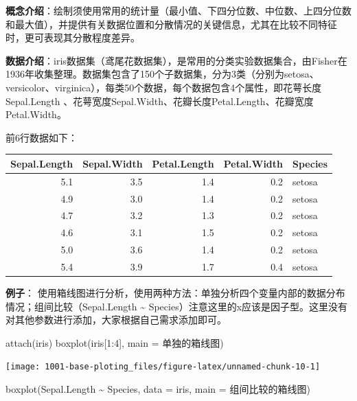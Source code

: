 \documentclass[
]{book}
\newenvironment{Shaded}{\begin{snugshade}}{\end{snugshade}}
\newcommand{\AttributeTok}[1]{\textcolor[rgb]{0.77,0.63,0.00}{#1}}
\newcommand{\DecValTok}[1]{\textcolor[rgb]{0.00,0.00,0.81}{#1}}
\newcommand{\FunctionTok}[1]{\textcolor[rgb]{0.00,0.00,0.00}{#1}}
\newcommand{\NormalTok}[1]{#1}
\newcommand{\SpecialCharTok}[1]{\textcolor[rgb]{0.00,0.00,0.00}{#1}}
\newcommand{\StringTok}[1]{\textcolor[rgb]{0.31,0.60,0.02}{#1}}
\begin{document}
\textbf{概念介绍}：绘制须使用常用的统计量（最小值、下四分位数、中位数、上四分位数和最大值），并提供有关数据位置和分散情况的关键信息，尤其在比较不同特征时，更可表现其分散程度差异。

\textbf{数据介绍}：iris数据集（鸢尾花数据集），是常用的分类实验数据集合，由Fisher在1936年收集整理。数据集包含了150个子数据集，分为3类（分别为setosa、versicolor、virginica），每类50个数据，每个数据包含4个属性，即花萼长度Sepal.Length 、花萼宽度Sepal.Width、花瓣长度Petal.Length、花瓣宽度Petal.Width。

前6行数据如下：

\begin{tabular}{r|r|r|r|l}
\hline
Sepal.Length & Sepal.Width & Petal.Length & Petal.Width & Species\\
\hline
5.1 & 3.5 & 1.4 & 0.2 & setosa\\
\hline
4.9 & 3.0 & 1.4 & 0.2 & setosa\\
\hline
4.7 & 3.2 & 1.3 & 0.2 & setosa\\
\hline
4.6 & 3.1 & 1.5 & 0.2 & setosa\\
\hline
5.0 & 3.6 & 1.4 & 0.2 & setosa\\
\hline
5.4 & 3.9 & 1.7 & 0.4 & setosa\\
\hline
\end{tabular}

\textbf{例子}：
使用箱线图进行分析，使用两种方法：单独分析四个变量内部的数据分布情况；组间比较（Sepal.Length \textasciitilde{} Species）注意这里的x应该是因子型。这里没有对其他参数进行添加，大家根据自己需求添加即可。

\begin{Shaded}
\begin{Highlighting}[]
\FunctionTok{attach}\NormalTok{(iris)}
\FunctionTok{boxplot}\NormalTok{(iris[}\DecValTok{1}\SpecialCharTok{:}\DecValTok{4}\NormalTok{], }\AttributeTok{main =} \StringTok{\textquotesingle{}单独的箱线图\textquotesingle{}}\NormalTok{)}
\end{Highlighting}
\end{Shaded}

\begin{center}\texttt{[image: 1001-base-ploting\_files/figure-latex/unnamed-chunk-10-1]} \end{center}

\begin{Shaded}
\begin{Highlighting}[]
\FunctionTok{boxplot}\NormalTok{(Sepal.Length }\SpecialCharTok{\textasciitilde{}}\NormalTok{ Species, }\AttributeTok{data =}\NormalTok{ iris, }\AttributeTok{main =} \StringTok{\textquotesingle{}组间比较的箱线图\textquotesingle{}}\NormalTok{)}
\end{Highlighting}
\end{Shaded}
\end{document}

